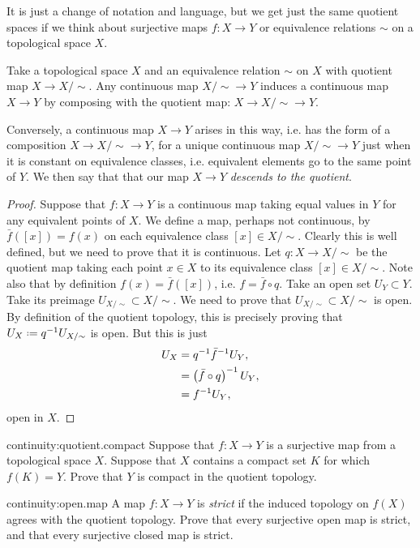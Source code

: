 It is just a change of notation and language, but we get just the same quotient spaces if we think about surjective maps \(f \colon X \to Y\) or equivalence relations \(\sim\) on a topological space \(X\).
\begin{theorem}
Take a topological space \(X\) and an equivalence relation \(\sim\) on \(X\) with quotient map \(X \to X/{\sim}\).
Any continuous map \(X/{\sim} \to Y\) induces a continuous map \(X \to Y\) by composing with the quotient map: \(X \to X/{\sim} \to Y\).

Conversely, a continuous map \(X \to Y\) arises in this way, i.e. has the form of a composition \(X \to X/{\sim} \to Y\), for a unique continuous map \(X/{\sim} \to Y\) just when it is constant on equivalence classes, i.e. equivalent elements go to the same point of \(Y\).
We then say that that our map \(X \to Y\) \emph{descends to the quotient}.
\end{theorem}
\begin{proof}
Suppose that \(f \colon X \to Y\) is a continuous map taking equal values in \(Y\) for any equivalent points of \(X\).
We define a map, perhaps not continuous, by \(\bar{f}([x])=f(x)\) on each equivalence class \([x] \in X/{\sim}\).
Clearly this is well defined, but we need to prove that it is continuous.
Let \(q \colon X \to X/\sim\) be the quotient map taking each point \(x \in X\) to its equivalence class \([x] \in X/\sim\).
Note also that by definition \(f(x)=\bar{f}([x])\), i.e. \(f=\bar{f} \circ q\).
Take an open set \(U_Y \subset Y\).
Take its preimage \(U_{X/{\sim}} \subset X/{\sim}\).
We need to prove that \(U_{X/{\sim}} \subset X/{\sim}\) is open.
By definition of the quotient topology, this is precisely proving that \(U_X \defeq q^{-1}U_{X/{\sim}}\) is open.
But this is just
\begin{align*}
U_X
&=
q^{-1} \bar{f}^{-1} U_Y,
\\
&= \left(\bar{f} \circ q\right)^{-1} U_Y,
\\
&=
f^{-1} U_Y,
\end{align*}
open in \(X\).
\end{proof}
\begin{problem}{continuity:quotient.compact}
Suppose that \(f \colon X \to Y\) is a surjective map from a topological space \(X\).
Suppose that \(X\) contains a compact set \(K\) for which \(f(K)=Y\).
Prove that \(Y\) is compact in the quotient topology.
\end{problem}
\begin{problem}{continuity:open.map}
A map \(f\colon X \to Y\) is \emph{strict} if the induced topology on \(f(X)\) agrees with the quotient topology.
Prove that every surjective open map is strict, and that every surjective closed map is strict.
\end{problem}
